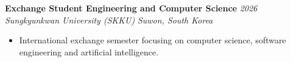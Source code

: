 \documentclass[letterpaper, 10pt]{article}
\begin{document}
\vspace{3pt}

\textbf{Exchange Student Engineering and Computer Science}
\hfill \textit{2026} \\
\textit{Sungkyunkwan University (SKKU)}
\hfill \textit{Suwon, South Korea}
\begin{itemize}
    \item International exchange semester focusing on
    computer science, software engineering and artificial intelligence.
\end{itemize}
\end{document}
